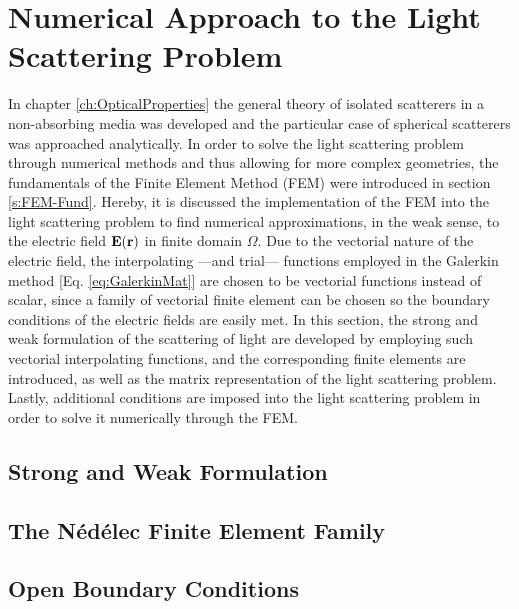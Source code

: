 \documentclass[11pt]{Latex/Classes/PhDthesisPSnPDF}
\begin{document}
    \section{Numerical Approach to the Light Scattering Problem}
     \label{s:Scat-FEM}

    In chapter \ref{ch:OpticalProperties} the general theory of isolated scatterers in a non-absorbing media was developed and the particular case of spherical scatterers was approached analytically. In order to solve the light scattering problem through numerical methods and thus allowing for more complex geometries, the fundamentals of the Finite Element Method (FEM) were introduced in section \ref{s:FEM-Fund}. Hereby, it is discussed the implementation of the FEM into the light scattering problem to find numerical approximations, in the weak sense, to the  electric field $\vb{E}(\vb{r})$ in finite domain $\Omega$. Due to the vectorial nature of the electric field, the interpolating ---and trial--- functions employed in the Galerkin method [Eq. \eqref{eq:GalerkinMat}] are chosen to be vectorial functions instead of scalar, since a family of vectorial finite element can be chosen so the boundary conditions of the electric fields are easily met. In this section, the strong and weak formulation of the scattering of light are developed by employing such vectorial interpolating functions, and the corresponding finite elements are introduced, as well as the matrix representation of the light scattering problem. Lastly, additional conditions are imposed into the light scattering problem in order to solve it numerically through the FEM.

        \subsection{Strong and Weak Formulation}
         \label{ss:Scat-Form}
         

         \subsection{The Nédélec Finite Element Family}
          \label{ss:Nedelec}
         

        \subsection{Open Boundary Conditions }
         \label{ss:Sommerfeld-PML}
\end{document}
